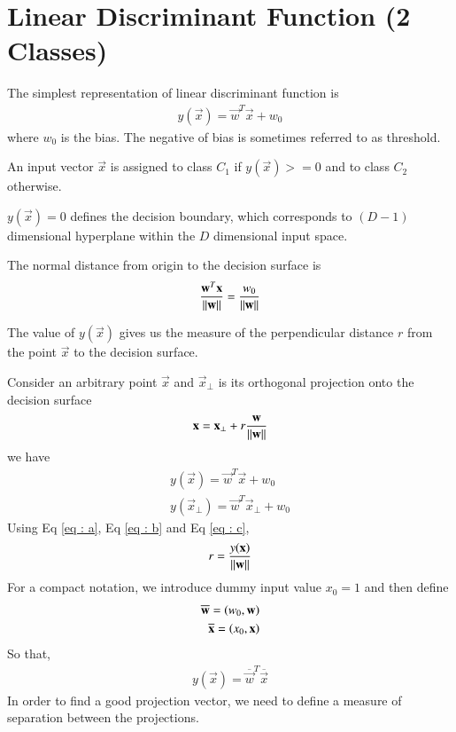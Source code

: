 \documentclass[journal,12pt,twocolumn]{IEEEtran}
\begin{document}
\section{Linear Discriminant Function (2 Classes)}
The simplest representation of linear discriminant function is
\begin{align}
    y(\vec{x}) = \vec{w}^T\vec{x} + w_{0}
\end{align}
where $w_{0}$ is the bias. The negative of bias is sometimes referred to as threshold.

An input vector $\vec{x}$ is assigned to class $C_{1}$ if $y(\vec{x}) >=0$ and to class $C_{2}$ otherwise.

$y(\vec{x}) = 0$ defines the decision boundary, which corresponds to $(D - 1)$ dimensional hyperplane within the $D$ dimensional input space.

The normal distance from origin to the decision surface is
\begin{align}
    \frac{\mathbf{w}^T\mathbf{x}}{\left\lVert\mathbf{w}\right\rVert} = \frac{w_{0}}{\left\lVert\mathbf{w}\right\rVert}
\end{align}

The value of $y(\vec{x})$ gives us the measure of the perpendicular distance $r$ from the point $\vec{x}$ to the decision surface.

Consider an arbitrary point $\vec{x}$ and $\vec{x}_{\perp}$ is its orthogonal projection onto the decision surface
\begin{align}
    \mathbf{x} = \mathbf{x}_{\perp} + r \frac{\mathbf{w}}{\left\lVert\mathbf{w}\right\rVert} \label{eq : a}
\end{align}
we have
\begin{align}
    y(\vec{x}) = \vec{w}^T\vec{x} + w_{0}\label{eq : b}\\
    y(\vec{x}_{\perp}) = \vec{w}^T\vec{x}_{\perp} + w_{0}\label{eq : c}
\end{align}
Using Eq \eqref{eq : a}, Eq \eqref{eq : b} and Eq \eqref{eq : c},
\begin{align}
    r = \frac{y(\mathbf{x})}{\left\lVert\mathbf{w}\right\rVert}
\end{align}
For a compact notation, we introduce dummy input value $x_{0} = 1$ and then define 
\begin{align}
    \overline{\mathbf{w}} = \left(w_{0},\mathbf{w}\right)\\
    \overline{\mathbf{x}} = \left(x_{0},\mathbf{x}\right)
\end{align}
So that,
\begin{align}
    y(\vec{x}) = \overline{\vec{w}}^{T}\overline{\vec{x}}
\end{align}
In order to find a good projection vector, we need to define a measure
of separation between the projections.
\end{document}
